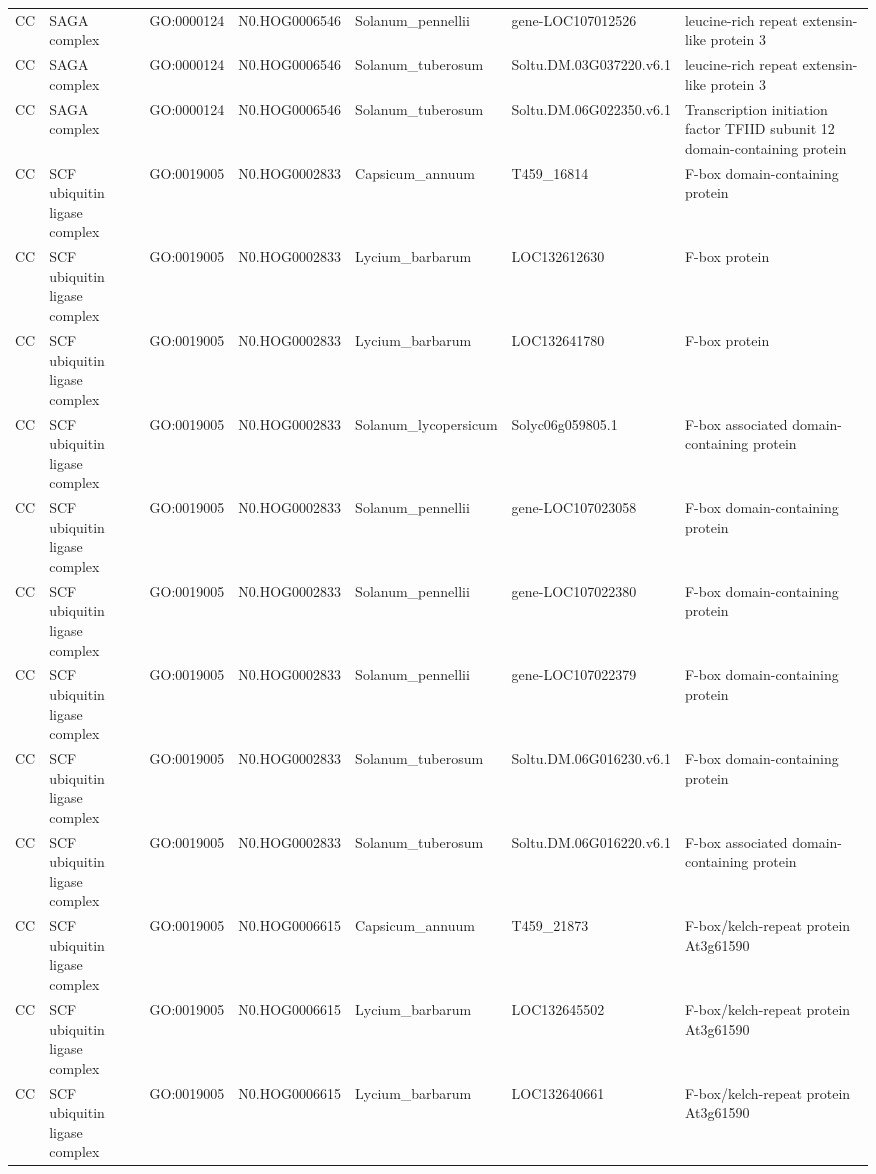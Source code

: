 \begin{table}
\begin{tabular}[t]{lllllll}
CC & SAGA complex & GO:0000124 & N0.HOG0006546 & Solanum\_pennellii & gene-LOC107012526 & leucine-rich repeat extensin-like protein 3\\
CC & SAGA complex & GO:0000124 & N0.HOG0006546 & Solanum\_tuberosum & Soltu.DM.03G037220.v6.1 & leucine-rich repeat extensin-like protein 3\\
CC & SAGA complex & GO:0000124 & N0.HOG0006546 & Solanum\_tuberosum & Soltu.DM.06G022350.v6.1 & Transcription initiation factor TFIID subunit 12 domain-containing protein\\
CC & SCF ubiquitin ligase complex & GO:0019005 & N0.HOG0002833 & Capsicum\_annuum & T459\_16814 & F-box domain-containing protein\\
CC & SCF ubiquitin ligase complex & GO:0019005 & N0.HOG0002833 & Lycium\_barbarum & LOC132612630 & F-box protein\\
CC & SCF ubiquitin ligase complex & GO:0019005 & N0.HOG0002833 & Lycium\_barbarum & LOC132641780 & F-box protein\\
CC & SCF ubiquitin ligase complex & GO:0019005 & N0.HOG0002833 & Solanum\_lycopersicum & Solyc06g059805.1 & F-box associated domain-containing protein\\
CC & SCF ubiquitin ligase complex & GO:0019005 & N0.HOG0002833 & Solanum\_pennellii & gene-LOC107023058 & F-box domain-containing protein\\
CC & SCF ubiquitin ligase complex & GO:0019005 & N0.HOG0002833 & Solanum\_pennellii & gene-LOC107022380 & F-box domain-containing protein\\
CC & SCF ubiquitin ligase complex & GO:0019005 & N0.HOG0002833 & Solanum\_pennellii & gene-LOC107022379 & F-box domain-containing protein\\
CC & SCF ubiquitin ligase complex & GO:0019005 & N0.HOG0002833 & Solanum\_tuberosum & Soltu.DM.06G016230.v6.1 & F-box domain-containing protein\\
CC & SCF ubiquitin ligase complex & GO:0019005 & N0.HOG0002833 & Solanum\_tuberosum & Soltu.DM.06G016220.v6.1 & F-box associated domain-containing protein\\
CC & SCF ubiquitin ligase complex & GO:0019005 & N0.HOG0006615 & Capsicum\_annuum & T459\_21873 & F-box/kelch-repeat protein At3g61590\\
CC & SCF ubiquitin ligase complex & GO:0019005 & N0.HOG0006615 & Lycium\_barbarum & LOC132645502 & F-box/kelch-repeat protein At3g61590\\
CC & SCF ubiquitin ligase complex & GO:0019005 & N0.HOG0006615 & Lycium\_barbarum & LOC132640661 & F-box/kelch-repeat protein At3g61590\\

\end{tabular}
\end{table}
